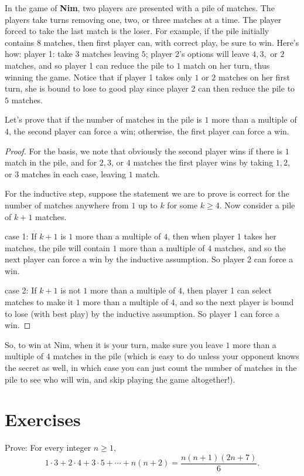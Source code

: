 \begin{exmp}
 In the game of {\bfseries Nim}, two players are presented with a
 pile of matches. The players take turns removing one, two, or three matches at a time.
 The player forced to take the last match is the loser. For example, if the pile initially
 contains $8$ matches, then first player can, with correct play, be sure to win.
 Here's how: player 1: take $3$ matches leaving $5$; player 2's options will leave
 $4, 3,$ or $2$ matches, and so player 1 can reduce the pile to $1$ match on her turn,
 thus winning the game. Notice that if player 1 takes only $1$ or $2$ matches on her
 first turn, she is bound to lose to good play since  player 2 can then reduce the pile to
 $5$ matches.
 
 Let's prove that if the number of matches in the pile is $1$ more than a multiple of $4$, the
 second player can force a win; otherwise, the first player can force a win.
 \begin{proof}
  For the basis, we note that obviously the second player wins if there is $1$ match in the pile,
 and for $2,3$, or $4$ matches the first player wins by taking $1,2$, or $3$ matches in each case,
 leaving $1$ match.
 
 For the inductive step, suppose the statement we are to prove is correct for the number of
 matches anywhere from $1$ up to $k$ for some $k\geq4$. Now consider a pile of $k+1$
 matches. 
 
 \textsf{case 1:}
 If $k+1$ is $1$ more than a multiple of $4$, then when player 1 takes her matches,
 the pile will {} contain $1$ more than a multiple of $4$ matches, and so the next player
 can force a win by the inductive assumption. So player 2 can force a win.
 
 \textsf{case 2:} If $k+1$ is not $1$ more than a multiple of $4$, then player 1 can select matches
 to make it $1$ more than a multiple of $4$, and so the next player is bound to lose (with best play) 
 by the inductive 
 assumption. So player 1 can force a win.
 \end{proof}
 \end{exmp}
 So, to win at Nim, when it is your turn, make sure you leave $1$ more than a multiple of $4$
 matches in the pile (which is easy to do unless your opponent knows the secret as well, in which
 case you can just count the number of matches in the pile to see who will win, and skip playing
 the game altogether!).


\clearpage
\section{Exercises}
\begin{exer} 
Prove: For every integer $n\geq 1$,
$$
1 \cdot 3+ 2 \cdot 4+3 \cdot 5+\cdots+n(n+2) = \frac{n(n+1)(2n+7)}{6}.
$$
\end{exer}

